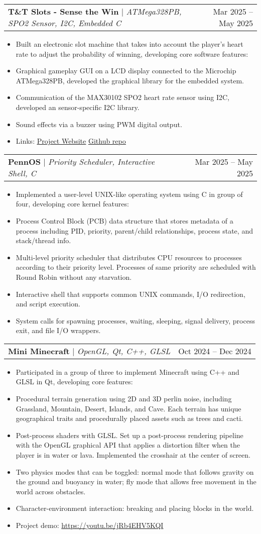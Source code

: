 \documentclass[letterpaper,11pt]{article}
\makeatletter
\newcommand{\resumeItem}[1]{
  \item\small{
    {#1 \vspace{-3pt}}
  }
}
\newcommand{\resumeProjectHeading}[2]{
    \item
    \begin{tabular*}{0.97\textwidth}{l@{\extracolsep{\fill}}r}
      \small#1 & #2 \\
    \end{tabular*}\vspace{-7pt}
}
\newcommand{\resumeItemListStart}{\begin{itemize}}
\newcommand{\resumeItemListEnd}{\end{itemize}\vspace{-5pt}}
\makeatother
\begin{document}
    \resumeProjectHeading
          {\textbf{T\&T Slots - Sense the Win} $|$ \emph{ATMega328PB, SPO2 Sensor, I2C, Embedded C}}{Mar 2025 -- May 2025}
          \resumeItemListStart
            \resumeItem{Built an electronic slot machine that takes into account the player's heart rate to adjust the probability of winning, developing core software features:}
            \resumeItem{Graphical gameplay GUI on a LCD display connected to the Microchip ATMega328PB, developed the graphical library for the embedded system.}
            \resumeItem{Communication of the MAX30102 SPO2 heart rate sensor using I2C, developed an sensor-specific I2C library.}
            \resumeItem{Sound effects via a buzzer using PWM digital output.}
            \resumeItem{Links: \href{https://upenn-embedded.github.io/final-project-s25-t-t-slots-sense-the-win/}{\underline{Project Website}}} \href{https://github.com/upenn-embedded/final-project-s25-t-t-slots-sense-the-win}{\underline{Github repo}}
          \resumeItemListEnd
          
    \resumeProjectHeading
          {\textbf{PennOS} $|$ \emph{Priority Scheduler, Interactive Shell, C}}{Mar 2025 -- May 2025}
          \resumeItemListStart
            \resumeItem{Implemented a user-level UNIX-like operating system using C in group of four, developing core kernel features:}
            \resumeItem{Process Control Block (PCB) data structure that stores metadata of a process including PID, priority, parent/child relationships, process state, and stack/thread info.}
            \resumeItem{Multi-level priority scheduler that distributes CPU resources to processes according to their priority level. Processes of same priority are scheduled with Round Robin without any starvation.}
            \resumeItem{Interactive shell that supports common UNIX commands, I/O redirection, and script execution.}
            \resumeItem{System calls for spawning processes, waiting, sleeping, signal delivery, process exit, and file I/O wrappers.}
          \resumeItemListEnd
          
    \resumeProjectHeading
          {\textbf{Mini Minecraft} $|$ \emph{OpenGL, Qt, C++, GLSL}}{Oct 2024 -- Dec 2024}
          \resumeItemListStart
            \resumeItem{Participated in a group of three to implement Minecraft using C++ and GLSL in Qt, developing core features:}
            \resumeItem{Procedural terrain generation using 2D and 3D perlin noise, including Grassland, Mountain, Desert, Islands, and Cave. Each terrain has unique geographical traits and procedurally placed assets such as trees and cacti.}
            \resumeItem{Post-process shaders with GLSL. Set up a post-process rendering pipeline with the OpenGL graphical API that applies a distortion filter when the player is in water or lava. Implemented the crosshair at the center of screen.}
            \resumeItem{Two physics modes that can be toggled: normal mode that follows gravity on the ground and buoyancy in water; fly mode that allows free movement in the world across obstacles.}
            \resumeItem{Character-environment interaction: breaking and placing blocks in the world.}
            \resumeItem{Project demo: \url{https://youtu.be/jRb4EHV5KQI}}
          \resumeItemListEnd
          
\end{document}
